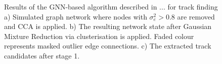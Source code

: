 \begin{center}
\begin{figure}[!htbp]
    \caption{Results of the GNN-based algorithm described in ... for track finding a) Simulated graph network where nodes with $\sigma_e^2 > 0.8$ are removed and CCA is applied. b) The resulting network state after Gaussian Mixture Reduction via clusterisation is applied. Faded colour represents masked outlier edge connections. c) The extracted track candidates after stage 1.}%
    \label{fig:example-application-2}%
\end{figure}
\end{center}




